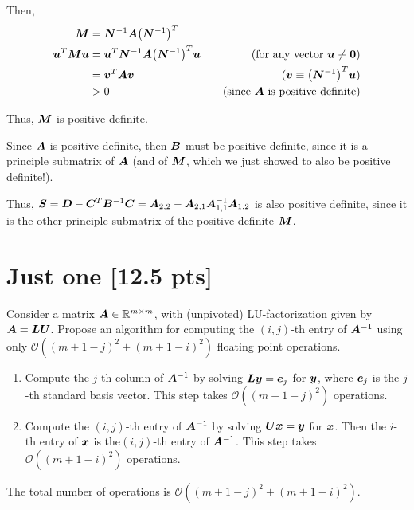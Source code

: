 \documentclass[twoside,10pt]{article}
\begin{document}
Then,
\begin{align*}
  \mtx{M} &=
  \mtx{N}^{-1}\mtx{A}\left(\mtx{N}^{-1}\right)^T\\
  \vct{u}^T\mtx{M}\vct{u}
  &=
  \vct{u}^T\mtx{N}^{-1}\mtx{A}\left(\mtx{N}^{-1}\right)^T\vct{u} &\quad \text{(for any vector $\vct{u} \not\equiv \vct{0}$)}\\
  &=
  \vct{v}^T\mtx{A}\vct{v} &\quad (\vct{v} \equiv \left(\mtx{N}^{-1}\right)^T\vct{u})\\
  &> 0 &\quad \text{(since $\mtx{A}$ is positive definite)}
\end{align*}

Thus, $\bm{M}$ is positive-definite.

Since $\bm{A}$ is positive definite, then $\bm{B}$ must be positive definite, since it is a principle submatrix of $\bm{A}$ (and of $\bm{M}$, which we just showed to also be positive definite!).

Thus, $\bm{S} = \bm{D} - \bm{C}^T \bm{B}^{-1} \bm{C} = \bm{A}_{2,2} - \bm{A}_{2,1} \bm{A}_{1,1}^{-1} \bm{A}_{1,2}$ is also positive definite, since it is the other principle submatrix of the positive definite $\bm{M}$.

\section{Just one [12.5 pts]}
Consider a matrix $\bm{A} \in \mathbb{R}^{m \times m}$, with (unpivoted) LU-factorization given by $\bm{A} = \bm{L} \bm{U}$. 
Propose an algorithm for computing the $(i, j)$-th entry of $\bm{A}^{-1}$ using only $\mathcal{O}\left(\left(m + 1 - j\right)^2 + \left(m + 1 - i\right)^2\right)$ floating point operations. 

\begin{enumerate}
\item Compute the $j$-th column of $\bm{A}^{-1}$ by solving $\bm{L} \bm{y} = \bm{e}_j$ for $\bm{y}$, where $\bm{e}_j$ is the $j$-th standard basis vector.
This step takes $\mathcal{O}(\left(m + 1 - j\right)^2)$ operations.
\item Compute the $(i, j)$-th entry of $\bm{A}^{-1}$ by solving $\bm{U} \bm{x} = \bm{y}$ for $\bm{x}$. Then the $i$-th entry of $\bm{x}$ is the$(i, j)$-th entry of $\bm{A}^{-1}$.
This step takes $\mathcal{O}(\left(m + 1 - i\right)^2)$ operations.
\end{enumerate}

\quad The total number of operations is $\mathcal{O}(\left(m + 1 - j\right)^2 + \left(m + 1 - i\right)^2)$.
\end{document}
